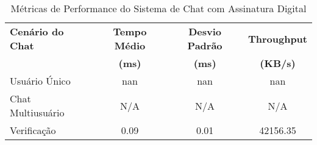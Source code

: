 \begin{table}[h]
\centering
\caption{Métricas de Performance do Sistema de Chat com Assinatura Digital}
\label{tab:chat_performance_metrics}
\begin{tabular}{|l|c|c|c|}
\hline
\textbf{Cenário do Chat} & \textbf{Tempo Médio} & \textbf{Desvio Padrão} & \textbf{Throughput} \\
& \textbf{(ms)} & \textbf{(ms)} & \textbf{(KB/s)} \\
\hline
Usuário Único & nan & nan & nan \\
Chat Multiusuário & N/A & N/A & N/A \\
Verificação & 0.09 & 0.01 & 42156.35 \\
\hline
\end{tabular}
\end{table}